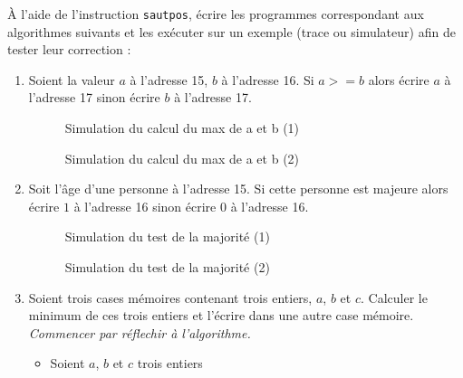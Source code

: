 À l'aide de l'instruction \verb|sautpos|, écrire les programmes correspondant aux
algorithmes suivants et les exécuter sur un exemple (trace ou simulateur) afin de tester leur correction :
\begin{enumerate}
\item Soient la valeur $a$ à l'adresse 15, $b$ à l'adresse 16. Si $a >= b$ alors écrire $a$ à l'adresse 17 sinon écrire $b$ à l'adresse 17.
\begin{correction}
\begin{figure} %
  \centering
 
  \caption{Simulation du calcul du max de a et b (1)}
  \label{simmax1}
\end{figure}
\begin{figure}
  \centering
  
  \caption{Simulation du calcul du max de a et b (2)}
  \label{simmax2}
\end{figure}
\end{correction}
\item Soit l'âge d'une personne à l'adresse 15. Si cette personne est majeure alors écrire $1$ à l'adresse 16 sinon écrire $0$ à l'adresse 16.
 \begin{correction}
\begin{figure}
  \centering
  
  \caption{Simulation du test de la majorité (1)}
  \label{simmaj1}
\end{figure}
\begin{figure}
  \centering
  
  \caption{Simulation du test de la majorité (2)}
  \label{simmaj2}
\end{figure}
 \end{correction}
\item Soient trois cases mémoires contenant trois entiers, $a$, $b$ et $c$. Calculer le
  minimum de ces trois entiers et l'écrire dans une autre case
  mémoire. \emph{Commencer par réflechir à l'algorithme.}
\begin{correction}
\begin{itemize}
\item Soient $a$, $b$ et $c$ trois entiers
\begin{listing}{20}

\end{listing}
\end{itemize}
\end{correction}
\end{enumerate}
